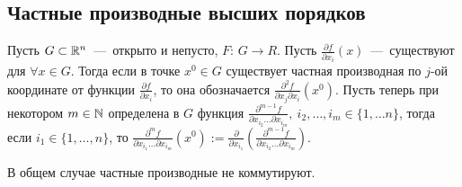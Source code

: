 \subsection{Частные производные высших порядков}
\begin{definition}
    Пусть $G \subset \mathbb{R}^n$~---~открыто и непусто, $F$: $G \rightarrow R$. Пусть $\frac{\partial f}{\partial x_i}(x)$~---~существуют для $\forall x \in G$. Тогда если в точке $x^0 \in G$ существует частная производная по $j$-ой координате от функции $\frac{\partial f}{\partial x_i}$, то она обозначается $\frac{\partial^2f}{\partial x_j \partial x_i}(x^0)$. Пусть теперь при некотором $m \in \mathbb{N}$ определена в $G$ функция $\frac{\partial^{m -1}f}{\partial x_{i_2} \dots \partial x_{i_m}}, \ i_2, \dots, i_m \in \{1, \dots n\}$, тогда если $i_1 \in \{1, \dots, n\}$, то $\frac{\partial^mf}{\partial x_{i_1}\dots\partial x_{i_m}}(x^0) := \frac{\partial}{\partial x_{i_1}}\left(\frac{\partial^{m - 1}f}{\partial x_{i_2}\dots \partial x_{i_m}}\right)$.
\end{definition}
\begin{note}
    В общем случае частные производные не коммутируют.
\end{note}
